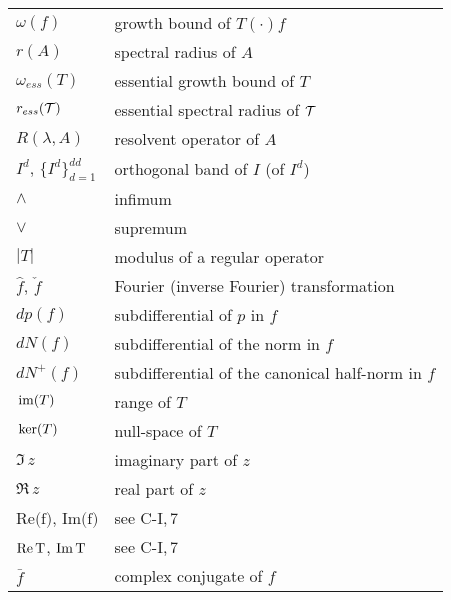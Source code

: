 \begin{longtable}{p{}p{}}
$\omega(f)$ & growth bound of $T(\cdot)f$ \\ %
$r(A)$ & spectral radius of $A$\\ %
$\omega_{ess}(T)$ & essential growth bound of $T$\\ %
$r_{ess}(\mathcal{T})$ & essential spectral radius of $\mathcal{T}$\\ %
$R(\lambda,A)$ & resolvent operator of $A$\\ %
$I^{d}$, $\{I^{d}\}_{d=1}^{dd}$ & orthogonal band of $I$ (of $I^{d}$) \\ %
$\wedge$ & infimum \\ %
$\vee$ & supremum \\ %
$|T|$ & modulus of a regular operator \\ %
$\hat{f}$, $\check{f}$ & Fourier (inverse Fourier) transformation \\ %
$dp(f)$ & subdifferential of $p$ in $f$ \\ %
$dN(f)$ & subdifferential of the norm in $f$ \\ %
$dN^{+}(f)$ & subdifferential of the canonical half-norm in $f$ \\ %
$\mathop{}\mathrm{im}(T)$ & range of $T$\\ %
$\mathop{}\mathrm{ker}(T)$ & null-space of $T$\\ %
$\Im \, z$ & imaginary part of $z$ \\ %
$\Re \, z$ & real part of $z$\\ %
$\text{Re(f)}$, $\text{Im(f)}$ &  see C-I,\,7 \\ %
$\text{Re\,T}$, $\text{Im\,T}$ & see C-I,\,7 \\ %
$\bar{f}$ & complex conjugate of $f$ \\ %

\end{longtable}
